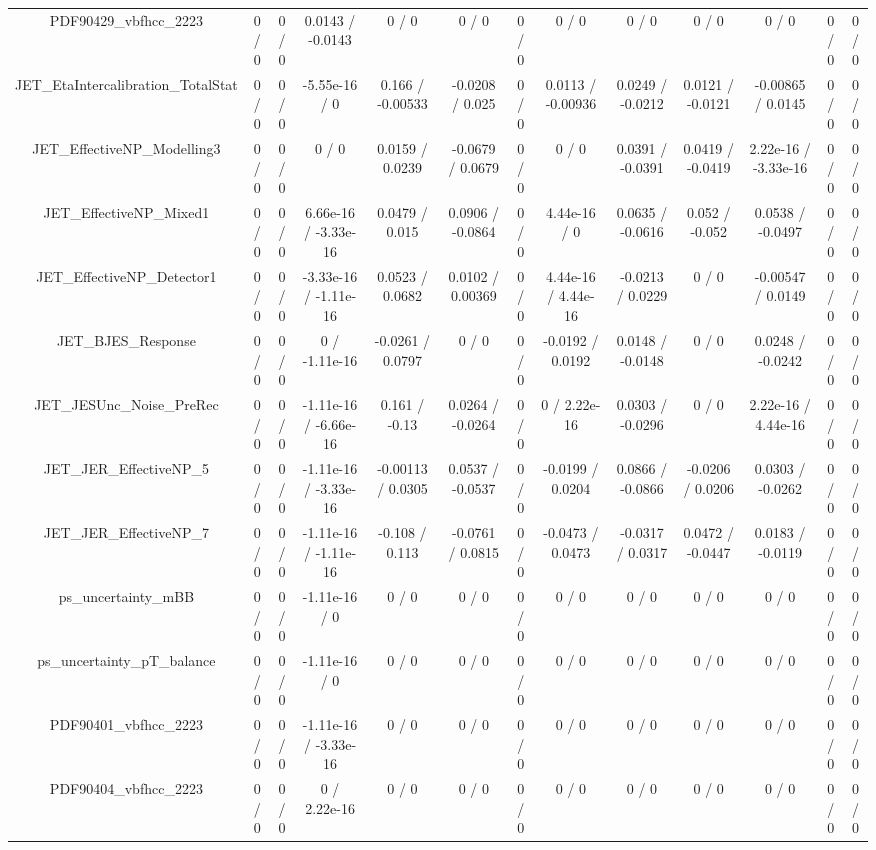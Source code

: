 \documentclass[10pt]{article}
\begin{document}
\begin{table}[htbp]
\begin{center}
\begin{tabular}{|c|c|c|c|c|c|c|c|c|c|c|c|c|}
  PDF90429_vbfhcc_2223 & 0 / 0 & 0 / 0 & 0.0143 / -0.0143 & 0 / 0 & 0 / 0 & 0 / 0 & 0 / 0 & 0 / 0 & 0 / 0 & 0 / 0 & 0 / 0 & 0 / 0 \\ 
  JET_EtaIntercalibration_TotalStat & 0 / 0 & 0 / 0 & -5.55e-16 / 0 & 0.166 / -0.00533 & -0.0208 / 0.025 & 0 / 0 & 0.0113 / -0.00936 & 0.0249 / -0.0212 & 0.0121 / -0.0121 & -0.00865 / 0.0145 & 0 / 0 & 0 / 0 \\ 
  JET_EffectiveNP_Modelling3 & 0 / 0 & 0 / 0 & 0 / 0 & 0.0159 / 0.0239 & -0.0679 / 0.0679 & 0 / 0 & 0 / 0 & 0.0391 / -0.0391 & 0.0419 / -0.0419 & 2.22e-16 / -3.33e-16 & 0 / 0 & 0 / 0 \\ 
  JET_EffectiveNP_Mixed1 & 0 / 0 & 0 / 0 & 6.66e-16 / -3.33e-16 & 0.0479 / 0.015 & 0.0906 / -0.0864 & 0 / 0 & 4.44e-16 / 0 & 0.0635 / -0.0616 & 0.052 / -0.052 & 0.0538 / -0.0497 & 0 / 0 & 0 / 0 \\ 
  JET_EffectiveNP_Detector1 & 0 / 0 & 0 / 0 & -3.33e-16 / -1.11e-16 & 0.0523 / 0.0682 & 0.0102 / 0.00369 & 0 / 0 & 4.44e-16 / 4.44e-16 & -0.0213 / 0.0229 & 0 / 0 & -0.00547 / 0.0149 & 0 / 0 & 0 / 0 \\ 
  JET_BJES_Response & 0 / 0 & 0 / 0 & 0 / -1.11e-16 & -0.0261 / 0.0797 & 0 / 0 & 0 / 0 & -0.0192 / 0.0192 & 0.0148 / -0.0148 & 0 / 0 & 0.0248 / -0.0242 & 0 / 0 & 0 / 0 \\ 
  JET_JESUnc_Noise_PreRec & 0 / 0 & 0 / 0 & -1.11e-16 / -6.66e-16 & 0.161 / -0.13 & 0.0264 / -0.0264 & 0 / 0 & 0 / 2.22e-16 & 0.0303 / -0.0296 & 0 / 0 & 2.22e-16 / 4.44e-16 & 0 / 0 & 0 / 0 \\ 
  JET_JER_EffectiveNP_5 & 0 / 0 & 0 / 0 & -1.11e-16 / -3.33e-16 & -0.00113 / 0.0305 & 0.0537 / -0.0537 & 0 / 0 & -0.0199 / 0.0204 & 0.0866 / -0.0866 & -0.0206 / 0.0206 & 0.0303 / -0.0262 & 0 / 0 & 0 / 0 \\ 
  JET_JER_EffectiveNP_7 & 0 / 0 & 0 / 0 & -1.11e-16 / -1.11e-16 & -0.108 / 0.113 & -0.0761 / 0.0815 & 0 / 0 & -0.0473 / 0.0473 & -0.0317 / 0.0317 & 0.0472 / -0.0447 & 0.0183 / -0.0119 & 0 / 0 & 0 / 0 \\ 
  ps_uncertainty_mBB & 0 / 0 & 0 / 0 & -1.11e-16 / 0 & 0 / 0 & 0 / 0 & 0 / 0 & 0 / 0 & 0 / 0 & 0 / 0 & 0 / 0 & 0 / 0 & 0 / 0 \\ 
  ps_uncertainty_pT_balance & 0 / 0 & 0 / 0 & -1.11e-16 / 0 & 0 / 0 & 0 / 0 & 0 / 0 & 0 / 0 & 0 / 0 & 0 / 0 & 0 / 0 & 0 / 0 & 0 / 0 \\ 
  PDF90401_vbfhcc_2223 & 0 / 0 & 0 / 0 & -1.11e-16 / -3.33e-16 & 0 / 0 & 0 / 0 & 0 / 0 & 0 / 0 & 0 / 0 & 0 / 0 & 0 / 0 & 0 / 0 & 0 / 0 \\ 
  PDF90404_vbfhcc_2223 & 0 / 0 & 0 / 0 & 0 / 2.22e-16 & 0 / 0 & 0 / 0 & 0 / 0 & 0 / 0 & 0 / 0 & 0 / 0 & 0 / 0 & 0 / 0 & 0 / 0 \\ 

\end{tabular}
\end{center}
\end{table}
\end{document}
